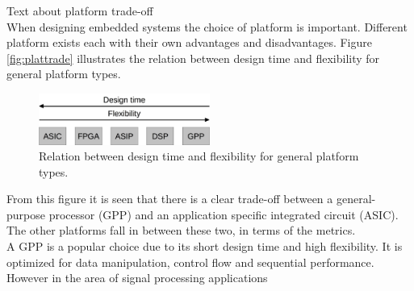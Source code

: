 Text about platform trade-off\\
When designing embedded systems the choice of platform is important. Different platform exists each with their own advantages and disadvantages. Figure \vref{fig:plattrade} illustrates the relation between design time and flexibility for general platform types. \\
\begin{figure}[ht!]
  \centering
  \includegraphics[width=0.5\textwidth]{figures/plattrade}
  \caption{Relation between design time and flexibility for general platform types.}
  \label{fig:plattrade}
\end{figure}
From this figure it is seen that there is a clear trade-off between a general-purpose processor (GPP) and an application specific integrated circuit (ASIC). The other platforms fall in between these two, in terms of the metrics. \\

A GPP is a popular choice due to its short design time and high flexibility. It is optimized for data manipulation, control flow and sequential performance. However in the area of signal processing applications  

